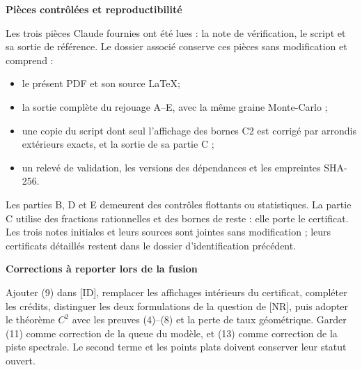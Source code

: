 \documentclass[11pt,a4paper]{article}
\newcommand{\subhead}[1]{{\bfseries\color{navy}#1}\par}
\begin{document}
\subhead{Pièces contrôlées et reproductibilité}
Les trois pièces Claude fournies ont été lues : la note de vérification, le script et sa sortie de référence. Le dossier associé conserve ces pièces sans modification et comprend :
\begin{itemize}
\item le présent PDF et son source \LaTeX ;
\item la sortie complète du rejouage A--E, avec la même graine Monte-Carlo ;
\item une copie du script dont seul l'affichage des bornes C2 est corrigé par arrondis extérieurs exacts, et la sortie de sa partie C ;
\item un relevé de validation, les versions des dépendances et les empreintes SHA-256.
\end{itemize}
Les parties B, D et E demeurent des contrôles flottants ou statistiques. La partie C utilise des fractions rationnelles et des bornes de reste : elle porte le certificat. Les trois notes initiales et leurs sources sont jointes sans modification ; leurs certificats détaillés restent dans le dossier d'identification précédent.

\subhead{Corrections à reporter lors de la fusion}
Ajouter (9) dans [ID], remplacer les affichages intérieurs du certificat, compléter les crédits, distinguer les deux formulations de la question de [NR], puis adopter le théorème $C^2$ avec les preuves (4)--(8) et la perte de taux géométrique. Garder (11) comme correction de la queue du modèle, et (13) comme correction de la piste spectrale. Le second terme et les points plats doivent conserver leur statut ouvert.
\end{document}
